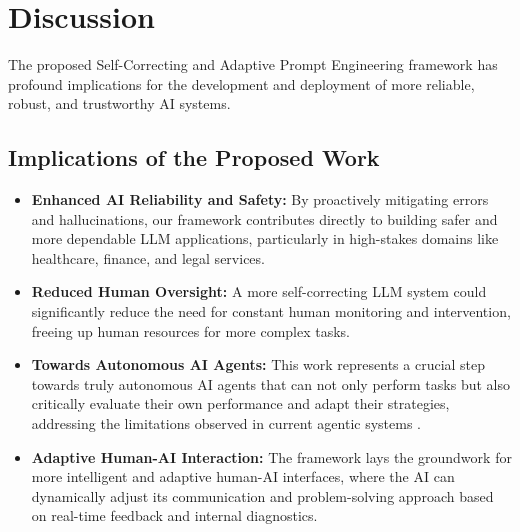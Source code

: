 \documentclass{article}
\begin{document}
\section{Discussion}
The proposed Self-Correcting and Adaptive Prompt Engineering framework has profound implications for the development and deployment of more reliable, robust, and trustworthy AI systems.

\subsection{Implications of the Proposed Work}
\begin{itemize}
    \item \textbf{Enhanced AI Reliability and Safety:} By proactively mitigating errors and hallucinations, our framework contributes directly to building safer and more dependable LLM applications, particularly in high-stakes domains like healthcare, finance, and legal services.
    \item \textbf{Reduced Human Oversight:} A more self-correcting LLM system could significantly reduce the need for constant human monitoring and intervention, freeing up human resources for more complex tasks.
    \item \textbf{Towards Autonomous AI Agents:} This work represents a crucial step towards truly autonomous AI agents that can not only perform tasks but also critically evaluate their own performance and adapt their strategies, addressing the limitations observed in current agentic systems \cite{P1}.
    \item \textbf{Adaptive Human-AI Interaction:} The framework lays the groundwork for more intelligent and adaptive human-AI interfaces, where the AI can dynamically adjust its communication and problem-solving approach based on real-time feedback and internal diagnostics.
\end{itemize}
\end{document}
